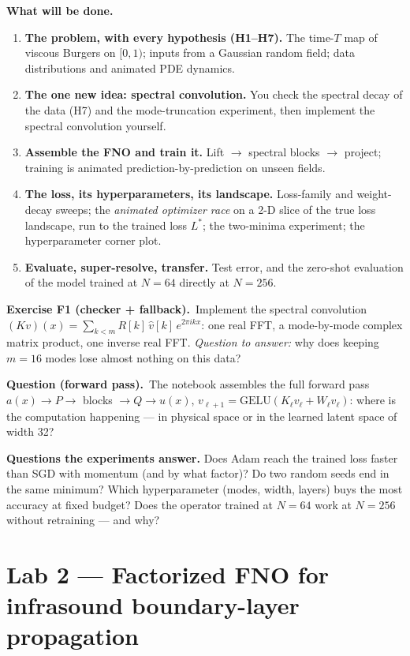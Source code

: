 \documentclass[11pt,a4paper]{article}
\newcommand{\exo}[2]{\medskip\noindent\textbf{Exercise #1 (#2).}\ }
\begin{document}
\textbf{What will be done.}
\begin{enumerate}[leftmargin=*,itemsep=1pt]
\item \textbf{The problem, with every hypothesis (H1--H7).} The time-$T$ map of viscous Burgers
on $[0,1)$; inputs from a Gaussian random field; data distributions and animated PDE dynamics.
\item \textbf{The one new idea: spectral convolution.} You check the spectral decay of the data
(H7) and the mode-truncation experiment, then implement the spectral convolution yourself.
\item \textbf{Assemble the FNO and train it.} Lift $\rightarrow$ spectral blocks $\rightarrow$
project; training is animated prediction-by-prediction on unseen fields.
\item \textbf{The loss, its hyperparameters, its landscape.} Loss-family and weight-decay sweeps;
the \emph{animated optimizer race} on a 2-D slice of the true loss landscape, run to the trained
loss $L^*$; the two-minima experiment; the hyperparameter corner plot.
\item \textbf{Evaluate, super-resolve, transfer.} Test error, and the zero-shot evaluation of
the model trained at $N{=}64$ directly at $N{=}256$.
\end{enumerate}

\exo{F1}{checker + fallback}Implement the spectral convolution
$(Kv)(x)=\sum_{k<m} R[k]\,\hat v[k]\,e^{2\pi ikx}$: one real FFT, a mode-by-mode complex matrix
product, one inverse real FFT. \emph{Question to answer:} why does keeping $m{=}16$ modes lose
almost nothing on this data?
\par\medskip\noindent\textbf{Question (forward pass).}\ The notebook assembles the full forward
pass $a(x)\to P \to$ blocks $\to Q \to u(x)$, $v_{\ell+1}=\mathrm{GELU}(K_\ell v_\ell + W_\ell v_\ell)$:
where is the computation happening --- in physical space or in the learned latent
space of width 32?

\textbf{Questions the experiments answer.} Does Adam reach the trained loss faster than SGD with
momentum (and by what factor)? Do two random seeds end in the same minimum? Which hyperparameter
(modes, width, layers) buys the most accuracy at fixed budget? Does the operator trained at
$N{=}64$ work at $N{=}256$ without retraining --- and why?

\section{Lab 2 --- Factorized FNO for infrasound boundary-layer propagation}
\end{document}
